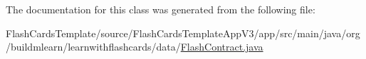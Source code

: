 The documentation for this class was generated from the following file\+:\begin{DoxyCompactItemize}
\item 
Flash\+Cards\+Template/source/\+Flash\+Cards\+Template\+App\+V3/app/src/main/java/org/buildmlearn/learnwithflashcards/data/\hyperlink{FlashContract_8java}{Flash\+Contract.\+java}\end{DoxyCompactItemize}
